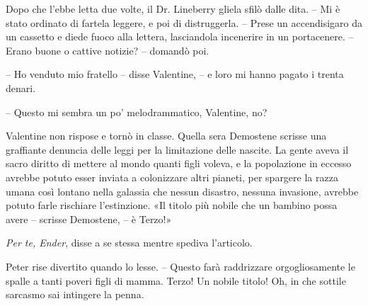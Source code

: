 {Dopo che l'ebbe letta due volte, il Dr. Lineberry gliela sfilò dalle
	dita. -- Mi è stato ordinato di fartela leggere, e poi di distruggerla.
	-- Prese un accendisigaro da un cassetto e diede fuoco alla lettera,
	lasciandola incenerire in un portacenere. -- Erano buone o cattive
	notizie? -- domandò poi.}

{-- Ho venduto mio fratello -- disse Valentine, -- e loro mi hanno
	pagato i trenta denari.}

{-- Questo mi sembra un po' melodrammatico, Valentine, no?}

{Valentine non rispose e tornò in classe. Quella sera Demostene scrisse
	una graffiante denuncia delle leggi per la limitazione delle nascite. La
	gente aveva il sacro diritto di mettere al mondo quanti figli voleva, e
	la popolazione in eccesso avrebbe potuto esser inviata a colonizzare
	altri pianeti, per spargere la razza umana così lontano nella galassia
	che nessun disastro, nessuna invasione, avrebbe potuto farle rischiare
	l'estinzione. «Il titolo più nobile che un bambino possa avere --
	scrisse Demostene, -- è Terzo!»}

\emph{{Per te, Ender}}{, \emph{} disse a se stessa mentre spediva
	l'articolo.}

{Peter rise divertito quando lo lesse. -- Questo farà raddrizzare
	orgogliosamente le spalle a tanti poveri figli di mamma. Terzo! Un
	nobile titolo! Oh, in che sottile sarcasmo sai intingere la penna.}

\label{Orsonux20Scottux20Cardux20-ux20Ilux20Giocoux20Diux20Enderux20-ux20BY_SLY70A1_split_012.htm}{}
